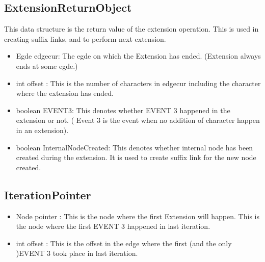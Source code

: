 \documentclass[a4paper]{article}
\begin{document}
\subsection{ExtensionReturnObject}
This data structure is the return value of the extension operation. This is used in creating suffix links, and to perform next extension.
\begin{itemize}
\item Egde edgecur: The egde on which the Extension has ended. (Extension always ends at some egde.)
\item int offset : This is the number of characters in edgecur including the character where the extension has ended.
\item boolean EVENT3: This denotes whether EVENT 3 happened in the extension or not. ( Event 3 is the event when no addition of character happen in an extension).
\item boolean InternalNodeCreated: This denotes whether internal node has been created during the extension. It is used to create suffix link for the new node created.
\end{itemize}
\subsection{IterationPointer}
\begin{itemize}
\item Node pointer : This is the node where the first Extension will happen. This is the node where the first EVENT 3 happened in last iteration.
\item int offset : This is the offset in the edge where the first (and the only )EVENT 3 took place in last iteration.
\end{itemize}
\end{document}
